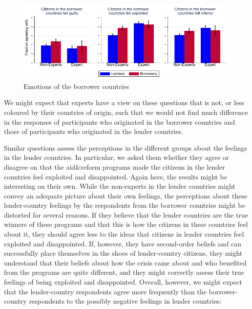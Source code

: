 
\begin{figure}
    \centering
    \caption{Emotions of the borrower countries}
    \includegraphics[scale=1.2]{graph5_1.pdf}
    
    \label{fig:my_label}
\end{figure}

We might expect that experts have a view on these questions that is not, or
less coloured by their countries of origin, such that we would not find much
difference in the responses of participants who originated in the borrower
countries and those of participants who originated in the lender countries.


Similar questions assess the perceptions in the different groups about the
feelings in the lender countries. In particular, we asked them whether they
agree or disagree on that the aid\&reform programs made the citizens in the
lender countries feel exploited and disappointed. Again here, the results
might be interesting on their own. While the non-experts in the lender
countries might convey an adequate picture about their own feelings, the
perceptions about these lender-country feelings by the respondents from the
borrower countries might be distorted for several reasons. If they believe
that the lender countries are the true winners of these programs and that
this is how the citizens in these countries feel about it, they should agree
less to the ideas that citizens in lender countries feel exploited and
disappointed. If, however, they have second-order beliefs and can
successfully place themselves in the shoes of lender-country citizens, they
might understand that their beliefs about how the crisis came about and who
benefited from the programs are quite different, and they might correctly
assess their true feelings of being exploited and disappointed. Overall,
however, we might expect that the lender-country respondents agree more
frequently than the borrower-country respondents to the possibly negative
feelings in lender countries:


